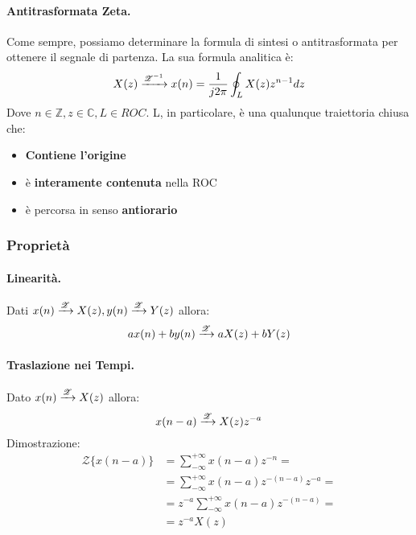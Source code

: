 \paragraph{Antitrasformata Zeta.}
Come sempre, possiamo determinare la formula di sintesi o antitrasformata per ottenere il segnale di partenza. La sua formula analitica è:
\begin{equation}
    X(z) \xrightarrow{\mathscr{Z}^{-1}} x(n) = \frac{1}{j2\pi} \oint_{L} X(z)z^{n-1}dz 
\end{equation}
Dove $n \in \mathbb{Z}, z \in \mathbb{C}, L \in ROC$. L, in particolare, è una qualunque traiettoria chiusa che:
\begin{itemize}
    \item \textbf{Contiene l'origine}
    \item è \textbf{interamente contenuta} nella ROC
    \item è percorsa in senso \textbf{antiorario}
\end{itemize}

\subsubsection{Proprietà}

\paragraph{Linearità.}Dati $x(n) \xrightarrow{\mathscr{Z}} X(z), y(n) \xrightarrow{\mathscr{Z}} Y(z)$ allora:
\begin{equation}
    ax(n) + by(n) \xrightarrow{\mathscr{Z}} aX(z) + bY(z)
\end{equation}

\paragraph{Traslazione nei Tempi.}Dato $x(n) \xrightarrow{\mathscr{Z}} X(z)$ allora:
\begin{equation}
    x(n - a) \xrightarrow{\mathscr{Z}} X(z)z^{-a}
\end{equation}
Dimostrazione:
\begin{align*}
    \mathscr{Z}\{x(n - a)\} &= \sum_{-\infty}^{+\infty} x(n - a)z^{-n} =\\
                            &= \sum_{-\infty}^{+\infty} x(n - a)z^{-(n - a)}z^{-a} =\\
                            &= z^{-a}\sum_{-\infty}^{+\infty} x(n - a)z^{-(n - a)}=\\
                            &= z^{-a}X(z)
\end{align*}

